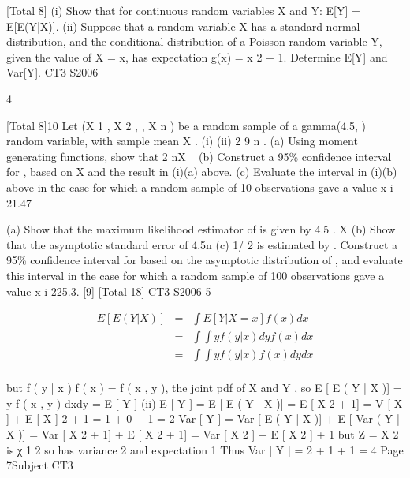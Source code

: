 \documentclass[a4paper,12pt]{article}
\begin{document}
\begin{enumerate}

[Total 8]
(i) Show that for continuous random variables X and Y:
E[Y] = E[E(Y|X)].
(ii)
Suppose that a random variable X has a standard normal distribution, and the
conditional distribution of a Poisson random variable Y, given the value of
X = x, has expectation g(x) = x 2 + 1.
Determine E[Y] and Var[Y].
CT3 S2006

4

[Total 8]10
Let (X 1 , X 2 ,
, X n ) be a random sample of a gamma(4.5, ) random variable, with sample mean X .
(i)
(ii)
2
9 n .
(a) Using moment generating functions, show that 2 nX ~
(b) Construct a 95\% confidence interval for , based on X and the result in (i)(a) above.
(c) Evaluate the interval in (i)(b) above in the case for which a random sample of 10 observations gave a value
x i 21.47

(a) Show that the maximum likelihood estimator of is given by
4.5
.
X
(b) Show that the asymptotic standard error of
4.5n
(c)
1/ 2
is estimated by
.
Construct a 95\% confidence interval for based on the asymptotic distribution of , and evaluate this interval in the case for which a
random sample of 100 observations gave a value x i 225.3.
[9]
[Total 18]
CT3 S2006
5

\begin{eqnarray*}
E [ E ( Y | X )] &=& \int E [ Y | X = x ] f ( x ) dx\\
&=& \int \int yf ( y | x ) dy f ( x ) dx\\
&=& \int \int y f ( y | x ) f ( x ) dydx\\
\end{eqnarray*}

but f ( y | x ) f ( x ) = f ( x , y ), the joint pdf of X and Y , so
E [ E ( Y | X )] = \int \int y f ( x , y ) dxdy = E [ Y ]
(ii)
E [ Y ] = E [ E ( Y | X )] = E [ X 2 + 1]
= V [ X ] + { E [ X ]} 2 + 1 = 1 + 0 + 1 = 2
Var [ Y ] = Var [ E ( Y | X )] + E [ Var ( Y | X )] = Var [ X 2 + 1] + E [ X 2 + 1]
= Var [ X 2 ] + E [ X 2 ] + 1
but Z = X 2 is χ 1 2 so has variance 2 and expectation 1
Thus Var [ Y ] = 2 + 1 + 1 = 4
Page 7Subject CT3 %



\end{enumerate}
\end{document}
